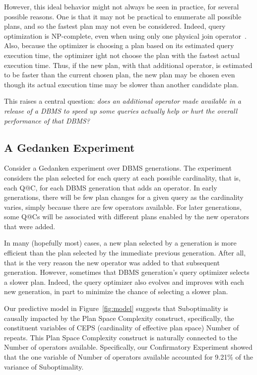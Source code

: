\documentclass[prodmode,acmtods]{acmsmall}
\begin{document}
However, this ideal behavior might not always be seen in practice, for
several possible reasons. One is that it may not be practical to enumerate
all possible plans, and so the fastest plan may not even be
considered. Indeed, query optimization is \hbox{NP-complete}, even when using only
one physical join operator~\cite{Ibaraki84}. Also, because the optimizer is
choosing a plan based on its estimated query execution time,
the optimizer ight not choose the plan with the fastest
actual execution time. Thus, if the new plan, with that additional operator,
is estimated to be faster than the current chosen plan, the new plan may be
chosen even though its actual execution time may be slower than another
candidate plan.

This raises a central question: {\em does an additional operator made
  available in a release of a DBMS to speed up some queries actually help or
  hurt the overall performance of that DBMS?}

\subsection{A Gedanken Experiment}\label{sec:gedanken}
Consider a Gedanken experiment over DBMS generations. The experiment
considers the plan selected for each query at each possible cardinality,
that is, each Q@C, for each \hbox{DBMS} generation that adds an
  operator. In early generations, there will be few plan changes for a
given query as the cardinality varies, 
simply \hbox{because} there are few operators available. For
later generations, some Q@Cs will be associated with different plans
enabled by the new operators that were added.

In many (hopefully most) cases, a new plan selected by a generation is
more efficient than the plan selected by the immediate previous
generation. After all, that is the very reason the new operator was
added to that subsequent generation.  However, sometimes that \hbox{DBMS} generation's query optimizer selects a slower plan.
Indeed, the query optimizer also evolves and improves with each new
generation, in part to minimize the chance of selecting a slower plan.

Our predictive model in Figure~\ref{fig:model} suggests that Suboptimality
is causally impacted by the Plan Space Complexity construct, specifically, the
constituent variables of CEPS (cardinality of effective plan
space) Number
of repeats. This Plan Space \hbox{Complexity} construct
is naturally connected to the Number of operators available. Specifically,
our Confirmatory Experiment showed that the one variable of Number of
operators available accounted for 9.21\% of the variance of Suboptimality.
\end{document}
